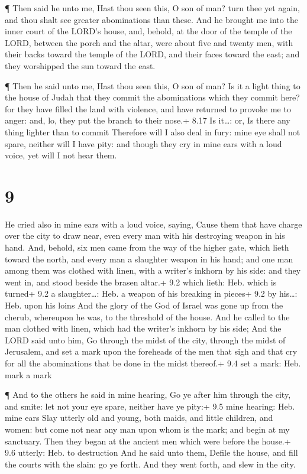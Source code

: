  ¶ Then said he unto me, Hast thou seen this, O son of man?
turn thee yet again, and thou shalt see greater abominations than these.
 And he brought me into the inner court of the LORD's
house, and, behold, at the door of the temple of the LORD, between the
porch and the altar, were about five and twenty men, with their backs
toward the temple of the LORD, and their faces toward the east; and they
worshipped the sun toward the east.

 ¶ Then he said unto me, Hast thou seen this, O son of man?
Is it a light thing to the house of Judah that they commit the
abominations which they commit here? for they have filled the land with
violence, and have returned to provoke me to anger: and, lo, they put
the branch to their nose.+ 8.17 Is it\ldots: or, Is there any thing
lighter than to commit  Therefore will I also deal in fury:
mine eye shall not spare, neither will I have pity: and though they cry
in mine ears with a loud voice, yet will I not hear them.

\hypertarget{section-8}{%
\section{9}\label{section-8}}

 He cried also in mine ears with a loud voice, saying, Cause
them that have charge over the city to draw near, even every man with
his destroying weapon in his hand.  And, behold, six men
came from the way of the higher gate, which lieth toward the north, and
every man a slaughter weapon in his hand; and one man among them was
clothed with linen, with a writer's inkhorn by his side: and they went
in, and stood beside the brasen altar.+ 9.2 which lieth: Heb. which is
turned+ 9.2 a slaughter\ldots: Heb. a weapon of his breaking in pieces+
9.2 by his\ldots: Heb. upon his loins  And the glory of the
God of Israel was gone up from the cherub, whereupon he was, to the
threshold of the house. And he called to the man clothed with linen,
which had the writer's inkhorn by his side;  And the LORD
said unto him, Go through the midst of the city, through the midst of
Jerusalem, and set a mark upon the foreheads of the men that sigh and
that cry for all the abominations that be done in the midst thereof.+
9.4 set a mark: Heb. mark a mark

 ¶ And to the others he said in mine hearing, Go ye after
him through the city, and smite: let not your eye spare, neither have ye
pity:+ 9.5 mine hearing: Heb. mine ears  Slay utterly old
and young, both maids, and little children, and women: but come not near
any man upon whom is the mark; and begin at my sanctuary. Then they
began at the ancient men which were before the house.+ 9.6 utterly: Heb.
to destruction  And he said unto them, Defile the house, and
fill the courts with the slain: go ye forth. And they went forth, and
slew in the city.


